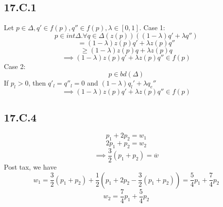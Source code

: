 \documentclass[letterpaper,12pt]{article}
\theoremstyle{definition}
\begin{document}
\subsection*{17.C.1}
Let $p \in \Delta, q' \in f(p), q'' \in f(p), \lambda \in [0,1]$.
Case 1: \[p \in int{\Delta}. \forall q \in \Delta(z(p))(\left( 1-\lambda \right)q' + \lambda q'') \]
\[ = (1- \lambda)z(p)q' + \lambda z( p) q'' \]
\[ \geq (1- \lambda)z(p)q + \lambda z( p) q \]
\[ \implies  (1- \lambda)z(p)q' + \lambda z( p) q'' \in f(p)\]
Case 2: \[ p \in bd(\Delta)\]
If $p_l > 0$, then $q'_l =q''_l = 0$ and $(1-\lambda) q_l' + \lambda q_e'' $
\[ \implies  (1- \lambda)z(p)q' + \lambda z( p) q'' \in f(p)\]

\subsection*{17.C.4}
\[p_1 + 2p_2 = w_1 \]
\[2p_1 + p_2 = w_2 \]
\[\implies \frac{3}{2}( p_1 + p_2) = \overline w \]
Post tax, we have 
\[w_1 = \frac{3}{2} (p_1 + p_2) + \frac{1}{2} (p_1 + 2p_2 - \frac{3}{2}(p_1 + p_2)) = \frac{5}{4}p_1 + \frac{7}{4}p_2\]
\[w_2 = \frac{7}{4}p_1 + \frac{5}{4}p_2\]
\end{document}
